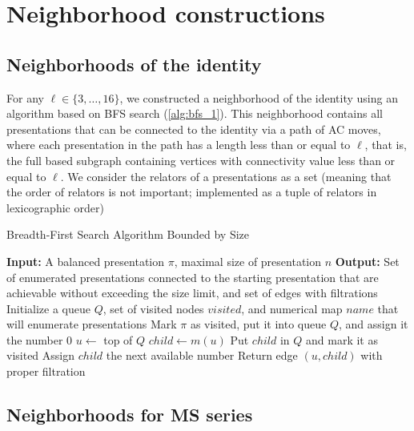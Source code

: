 
\section{Neighborhood constructions}\label{s:neighborhoods}

\subsection{Neighborhoods of the identity}

For any $\ell \in \{3, \dots, 16\}$, we constructed a neighborhood of the identity using an algorithm based on BFS search (\autoref{alg:bfs_1}).
This neighborhood contains all presentations that can be connected to the identity via a path of AC moves, where each presentation in the path has a length less than or equal to $\ell$, that is, the full based subgraph containing vertices with connectivity value less than or equal to $\ell$.
We consider the relators of a presentations as a set (meaning that the order of relators is not important; implemented as a tuple of relators in lexicographic order) 

\begin{algorithm}
	\caption{Breadth-First Search Algorithm Bounded by Size}
    \label{alg:bfs_1}
	\begin{algorithmic}[1]
		\State \textbf{Input:} A balanced presentation $\pi$, maximal size of presentation $n$
		\State \textbf{Output:} Set of enumerated presentations connected to the starting presentation that are achievable without exceeding the size limit, and set of edges with filtrations
		\State Initialize a queue $Q$, set of visited nodes $visited$, and numerical map $name$ that will enumerate presentations
		\State Mark $\pi$ as visited, put it into queue $Q$, and assign it the number $0$
		\State $u \gets $ top of $Q$ 
		\State $child \gets m(u)$
		\State Put $child$ in $Q$ and mark it as visited
		\State Assign $child$ the next available number
		\EndIf
		\State Return edge $(u, child)$ with proper filtration
		\EndIf
		\EndFor
		\EndWhile
	\end{algorithmic}
\end{algorithm}

\subsection{Neighborhoods for MS series}

